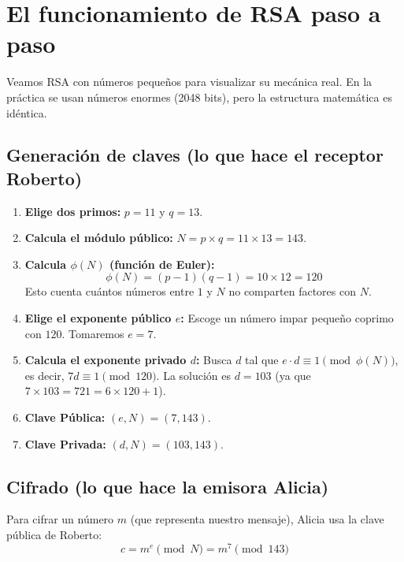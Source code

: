 \section{El funcionamiento de RSA paso a paso}

Veamos RSA con números pequeños para visualizar su mecánica real. En la práctica se usan números enormes (2048 bits), pero la estructura matemática es idéntica.

\subsection*{Generación de claves (lo que hace el receptor Roberto)}

\begin{ejemplonumerico}[RSA con números pequeños: $p=11$, $q=13$]
\begin{enumerate}
  \item \textbf{Elige dos primos:} $p = 11$ y $q = 13$.
  
  \item \textbf{Calcula el módulo público:} $N = p \times q = 11 \times 13 = 143$.
  
  \item \textbf{Calcula $\phi(N)$ (función de Euler):}
  \[
  \phi(N) = (p-1)(q-1) = 10 \times 12 = 120
  \]
  Esto cuenta cuántos números entre $1$ y $N$ no comparten factores con $N$.
  
  \item \textbf{Elige el exponente público $e$:} Escoge un número impar pequeño coprimo con $120$. Tomaremos $e = 7$.
  
  \item \textbf{Calcula el exponente privado $d$:} Busca $d$ tal que $e \cdot d \equiv 1 \pmod{\phi(N)}$, es decir, $7d \equiv 1 \pmod{120}$. La solución es $d = 103$ (ya que $7 \times 103 = 721 = 6 \times 120 + 1$).
  
  \item \textbf{Clave Pública:} $(e, N) = (7, 143)$.
  \item \textbf{Clave Privada:} $(d, N) = (103, 143)$.
\end{enumerate}
\end{ejemplonumerico}

\subsection*{Cifrado (lo que hace la emisora Alicia)}

Para cifrar un número $m$ (que representa nuestro mensaje), Alicia usa la clave pública de Roberto:
\[
c = m^e \pmod N = m^7 \pmod{143}
\]

